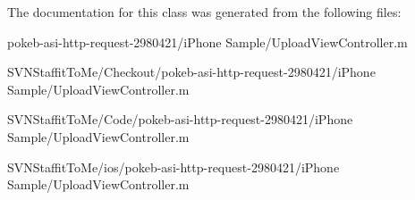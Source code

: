 \-The documentation for this class was generated from the following files\-:\begin{DoxyCompactItemize}
\item 
pokeb-\/asi-\/http-\/request-\/2980421/i\-Phone Sample/\-Upload\-View\-Controller.\-m\item 
\-S\-V\-N\-Staffit\-To\-Me/\-Checkout/pokeb-\/asi-\/http-\/request-\/2980421/i\-Phone Sample/\-Upload\-View\-Controller.\-m\item 
\-S\-V\-N\-Staffit\-To\-Me/\-Code/pokeb-\/asi-\/http-\/request-\/2980421/i\-Phone Sample/\-Upload\-View\-Controller.\-m\item 
\-S\-V\-N\-Staffit\-To\-Me/ios/pokeb-\/asi-\/http-\/request-\/2980421/i\-Phone Sample/\-Upload\-View\-Controller.\-m\end{DoxyCompactItemize}
